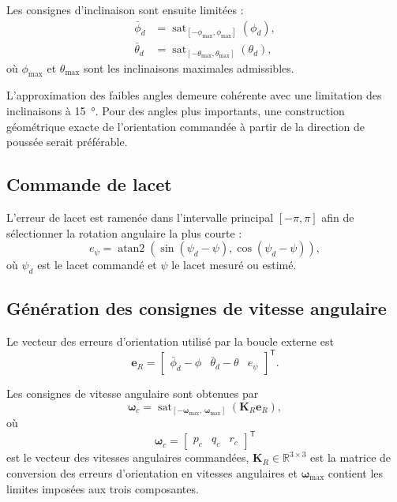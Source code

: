 \documentclass[11pt,a4paper,oneside]{report}
\newcommand{\vect}[1]{\bm{#1}}
\newcommand{\mat}[1]{\bm{#1}}
\newcommand{\trans}{^{\mathsf T}}
\newcommand{\sat}{\operatorname{sat}}
\begin{document}
Les consignes d'inclinaison sont ensuite limitées :
\begin{subequations}
	\label{eq_attitude_command_saturation}
	\begin{align}
		\bar\phi_d
		&=
		\sat_{[-\phi_{\max},\phi_{\max}]}
		\left(\phi_d\right),
		\\
		\bar\theta_d
		&=
		\sat_{[-\theta_{\max},\theta_{\max}]}
		\left(\theta_d\right),
	\end{align}
\end{subequations}
où $\phi_{\max}$ et $\theta_{\max}$ sont les inclinaisons maximales admissibles.

L'approximation des faibles angles demeure cohérente avec une limitation des inclinaisons à \SI{15}{\degree}. Pour des angles plus importants, une construction géométrique exacte de l'orientation commandée à partir de la direction de poussée serait préférable.

\subsection{Commande de lacet}

L'erreur de lacet est ramenée dans l'intervalle principal $[-\pi,\pi]$ afin de sélectionner la rotation angulaire la plus courte :
\begin{equation}
	e_\psi
	=
	\operatorname{atan2}
	\left(
	\sin(\psi_d-\psi),
	\cos(\psi_d-\psi)
	\right),
	\label{eq_yaw_error}
\end{equation}
où $\psi_d$ est le lacet commandé et $\psi$ le lacet mesuré ou estimé.

\subsection{Génération des consignes de vitesse angulaire}

Le vecteur des erreurs d'orientation utilisé par la boucle externe est
\begin{equation}
	\vect e_R
	=
	\begin{bmatrix}
		\bar\phi_d-\phi &
		\bar\theta_d-\theta &
		e_\psi
	\end{bmatrix}\trans.
	\label{eq_attitude_error_outer_loop}
\end{equation}

Les consignes de vitesse angulaire sont obtenues par
\begin{equation}
	\vect\omega_c
	=
	\sat_{[-\vect\omega_{\max},\,\vect\omega_{\max}]}
	\left(
	\mat K_R\vect e_R
	\right),
	\label{eq_body_rate_command}
\end{equation}
où
\begin{equation}
	\vect\omega_c
	=
	\begin{bmatrix}
		p_c & q_c & r_c
	\end{bmatrix}\trans
\end{equation}
est le vecteur des vitesses angulaires commandées, $\mat K_R\in\mathbb{R}^{3\times3}$ est la matrice de conversion des erreurs d'orientation en vitesses angulaires et $\vect\omega_{\max}$ contient les limites imposées aux trois composantes.
\end{document}
